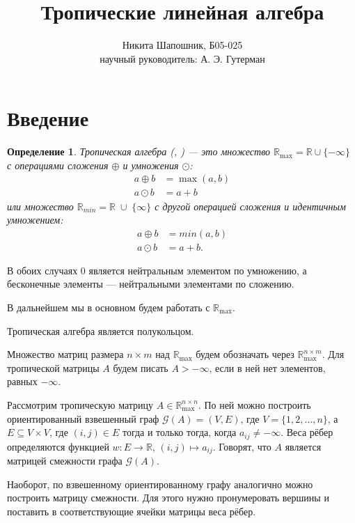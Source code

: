 \documentclass[12pt]{article}
\title{Тропические линейная алгебра}
\author{Никита Шапошник, Б05-025\\ научный руководитель: А. Э. Гутерман}
\date{}
\newtheorem{definition}[theorem]{Определение}
\begin{document}
\maketitle

\section{Введение}
\begin{definition}
Тропическая алгебра (\cite{glanceOnTropicalLA},
        \cite{tropicalMath}) --- это множество $\mathbb{R}_{\max} = \mathbb{R} \cup \{ -\infty\}$ с операциями сложения $\oplus$ и умножения $\odot$: \begin{align*}
            a \oplus b &= \max(a, b)\\
            a \odot b &= a + b
        \end{align*}      
        или множество $\mathbb{R}_{min} = \mathbb{R} \; \cup \; \{ \infty\}$ с другой операцией сложения и идентичным умножением: \begin{align*}
            a \oplus b &= min(a, b)\\
            a \odot b &= a + b.
        \end{align*}
\end{definition}

В обоих случаях $0$ является нейтральным элементом по умножению, а бесконечные элементы --- нейтральными элементами по сложению.

В дальнейшем мы в основном будем работать с $\mathbb{R}_{\max}$.

Тропическая алгебра является полукольцом.

Множество матриц размера $n \times m$ над $\mathbb{R}_{\max}$ будем обозначать через $\mathbb{R}_{\max}^{n \times m}$. Для тропической матрицы $A$ будем писать $A > -\infty$, если в ней нет элементов, равных $-\infty$. 

Рассмотрим тропическую матрицу $A \in \mathbb{R}_{\max}^{n \times n}$. По ней можно построить ориентированный взвешенный граф $\mathcal{G}(A) = (V, E)$, где $V = \{ 1, 2, \dots, n\}$, а $E \subseteq V \times V$, где $(i, j) \in E$ тогда и только тогда, когда $a_{ij} \ne -\infty$. Веса рёбер определяются функцией $w : E \rightarrow \mathbb{R}$, $(i, j) \mapsto a_{ij}$. Говорят, что $A$ является матрицей смежности графа $\mathcal{G}(A)$.

Наоборот, по взвешенному ориентированному графу аналогично можно построить матрицу смежности. Для этого нужно пронумеровать вершины и поставить в соответствующие ячейки матрицы веса рёбер.
\end{document}
